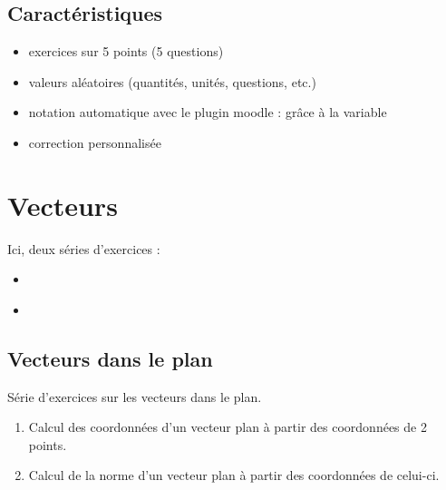 \documentclass[letterpaper,10pt,french]{sphinxmanual}
\begin{document}
\subsection{Caractéristiques}
\label{\detokenize{geom-thales:caracteristiques}}\begin{itemize}
\item {} 
exercices sur 5 points (5 questions)

\item {} 
valeurs aléatoires (quantités, unités, questions, etc.)

\item {} 
notation automatique avec le plugin moodle : grâce à la variable 

\item {} 
correction personnalisée

\end{itemize}


\section{Vecteurs}
\label{\detokenize{geom-vecteur::doc}}\label{\detokenize{geom-vecteur:vecteurs}}
Ici, deux séries d’exercices :
\begin{itemize}
\item {} 
{\hyperref[\detokenize{geom-vecteur:plan}]{}}

\item {} 
{\hyperref[\detokenize{geom-vecteur:espace}]{}}

\end{itemize}


\subsection{Vecteurs dans le plan}
\label{\detokenize{geom-vecteur:plan}}\label{\detokenize{geom-vecteur:vecteurs-dans-le-plan}}
Série d’exercices sur les vecteurs dans le plan.
\begin{enumerate}
\item {} 
Calcul des coordonnées d’un vecteur plan à partir des coordonnées de 2 points.

\item {} 
Calcul de la norme d’un vecteur plan à partir des coordonnées de celui-ci.

\end{enumerate}
\end{document}
